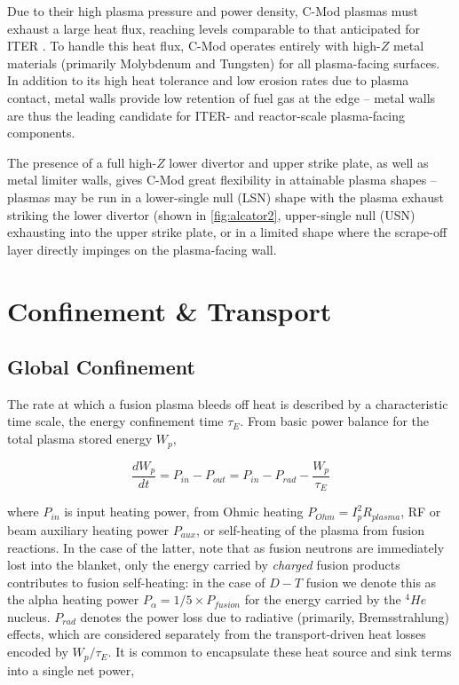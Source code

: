 Due to their high plasma pressure and power density, C-Mod plasmas must exhaust a large heat flux, reaching levels comparable to that anticipated for ITER \cite{Loarte2007,Terry2007,LaBombard2011}.  To handle this heat flux, C-Mod operates entirely with high-$Z$ metal materials (primarily Molybdenum and Tungsten) for all plasma-facing surfaces.  In addition to its high heat tolerance and low erosion rates due to plasma contact, metal walls provide low retention of fuel gas at the edge -- metal walls are thus the leading candidate for ITER- and reactor-scale plasma-facing components.

The presence of a full high-$Z$ lower divertor and upper strike plate, as well as metal limiter walls, gives C-Mod great flexibility in attainable plasma shapes -- plasmas may be run in a lower-single null (LSN) shape with the plasma exhaust striking the lower divertor (shown in \cref{fig:alcator2}, upper-single null (USN) exhausting into the upper strike plate, or in a limited shape where the scrape-off layer directly impinges on the plasma-facing wall.\nicesectionending


\section{Confinement \& Transport}\label{sec:intro_confinement}

\subsection{Global Confinement}\label{subsec:intro_global}

The rate at which a fusion plasma bleeds off heat is described by a characteristic time scale, the energy confinement time $\tau_E$.  From basic power balance for the total plasma stored energy $W_p$,

\begin{equation}\label{eq:powerbalance}
 \frac{dW_p}{dt} = P_{in} - P_{out} = P_{in} - P_{rad} - \frac{W_p}{\tau_E}
\end{equation}

\noindent where $P_{in}$ is input heating power, from Ohmic heating $P_{Ohm} = I_p^2 R_{plasma}$, RF or beam auxiliary heating power $P_{aux}$, or self-heating of the plasma from fusion reactions.  In the case of the latter, note that as fusion neutrons are immediately lost into the blanket, only the energy carried by \emph{charged} fusion products contributes to fusion self-heating: in the case of $\si{D} - \si{T}$ fusion we denote this as the alpha heating power $P_{\alpha} = 1/5 \times P_{fusion}$ for the energy carried by the ${}^4\si{He}$ nucleus.  $P_{rad}$ denotes the power loss due to radiative (primarily, Bremsstrahlung) effects, which are considered separately from the transport-driven heat losses encoded by $W_p/\tau_E$.  It is common to encapsulate these heat source and sink terms into a single net power,

